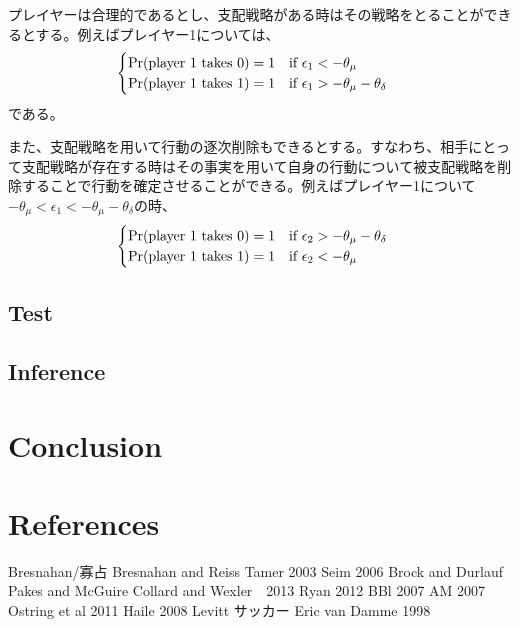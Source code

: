 \documentclass{jsarticle}
\begin{document}
プレイヤーは合理的であるとし、支配戦略がある時はその戦略をとることができるとする。例えばプレイヤー1については、
\begin{align*}
	\begin{cases}
		{\rm Pr}(\text{player 1 takes $0$}) = 1\quad \text{if}\ \epsilon_1 < -\theta_{\mu}\\
		{\rm Pr}(\text{player 1 takes $1$}) = 1\quad \text{if}\ \epsilon_1 > -\theta_{\mu} - \theta_{\delta}
	\end{cases}
\end{align*}
である。

また、支配戦略を用いて行動の逐次削除もできるとする。すなわち、相手にとって支配戦略が存在する時はその事実を用いて自身の行動について被支配戦略を削除することで行動を確定させることができる。例えばプレイヤー1について$-\theta_{\mu} < \epsilon_1 < -\theta_{\mu} - \theta_{\delta}$の時、
\begin{align*}
	\begin{cases}
		{\rm Pr}(\text{player 1 takes $0$}) = 1\quad \text{if}\ \epsilon_2 > -\theta_{\mu} - \theta_{\delta}\\
		{\rm Pr}(\text{player 1 takes $1$}) = 1\quad \text{if}\ \epsilon_2 < -\theta_{\mu}
	\end{cases}
\end{align*}

\subsection{Test}

\subsection{Inference}

\section{Conclusion}

\section{References}
\begin{thebibliography}{10}
	 Bresnahan/寡占
	 Bresnahan and Reiss
	 Tamer 2003
	 Seim 2006
	 Brock and Durlauf
	 Pakes and McGuire
	 Collard and Wexler　2013
	 Ryan 2012
	 BBl 2007
	 AM 2007
	 Ostring et al 2011
	 Haile 2008
	 Levitt サッカー
	 Eric van Damme 1998
\end{thebibliography}
\end{document}
